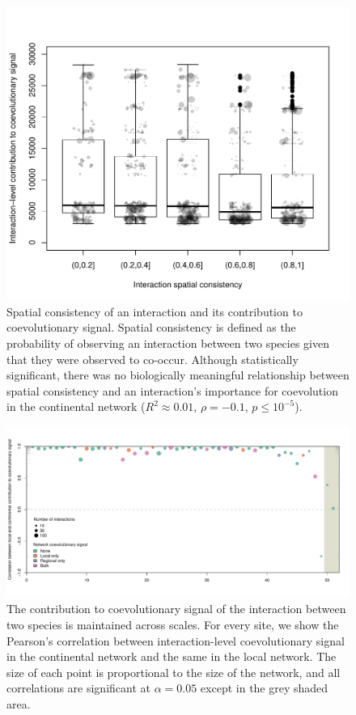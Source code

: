 \documentclass{pnastwo}
\begin{document}
\clearpage

\begin{figure}[p]
\centering
\includegraphics[width=\textwidth]{figure3.pdf}
\caption{Spatial consistency of an interaction and its contribution to
coevolutionary signal. Spatial consistency is defined as the probability
of observing an interaction between two species given that they were
observed to co-occur. Although statistically significant, there was no
biologically meaningful relationship between spatial consistency and an
interaction's importance for coevolution in the continental network
(\(R^2 \approx 0.01\), \(\rho = -0.1\), \(p \leq 10^{-5}\)).}
\end{figure}

\clearpage

\begin{figure}[p]
\centering
\includegraphics[width=\textwidth]{figure2.pdf}
\caption{The contribution to coevolutionary signal of the interaction
between two species is maintained across scales. For every site, we show
the Pearson's correlation between interaction-level coevolutionary
signal in the continental network and the same in the local network. The
size of each point is proportional to the size of the network, and all
correlations are significant at \(\alpha = 0.05\) except in the grey
shaded area.}
\end{figure}
\end{document}
